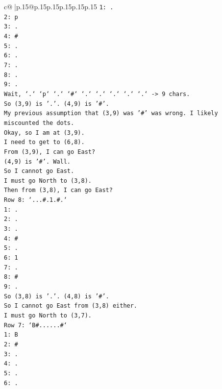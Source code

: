 \documentclass{article}
\begin{document}
{\begin{supertabular}{c@{$\;$}|p{.15\linewidth}@{}p{.15\linewidth}p{.15\linewidth}p{.15\linewidth}p{.15\linewidth}p{.15\linewidth}}
{{{\texttt{1: .} \\
\texttt{2: p} \\
\texttt{3: .} \\
\texttt{4: \#} \\
\texttt{5: .} \\
\texttt{6: .} \\
\texttt{7: .} \\
\texttt{8: .} \\
\texttt{9: .} \\
\texttt{Wait, `.` `p` `.` `\#` `.` `.` `.` `.` `.` {-}> 9 chars.} \\
\texttt{So (3,9) is '.'. (4,9) is '\#'.} \\
\texttt{My previous assumption that (3,9) was '\#' was wrong. I likely miscounted the dots.} \\
\texttt{Okay, so I am at (3,9).} \\
\texttt{I need to get to (6,8).} \\
\texttt{From (3,9), I can go East?} \\
\texttt{(4,9) is '\#'. Wall.} \\
\texttt{So I cannot go East.} \\
\texttt{I must go North to (3,8).} \\
\texttt{Then from (3,8), I can go East?} \\
\texttt{Row 8: `...\#.1.\#.`} \\
\texttt{1: .} \\
\texttt{2: .} \\
\texttt{3: .} \\
\texttt{4: \#} \\
\texttt{5: .} \\
\texttt{6: 1} \\
\texttt{7: .} \\
\texttt{8: \#} \\
\texttt{9: .} \\
\texttt{So (3,8) is '.'. (4,8) is '\#'.} \\
\texttt{So I cannot go East from (3,8) either.} \\
\texttt{I must go North to (3,7).} \\
\texttt{Row 7: `B\#......\#`} \\
\texttt{1: B} \\
\texttt{2: \#} \\
\texttt{3: .} \\
\texttt{4: .} \\
\texttt{5: .} \\
\texttt{6: .} \\
}}}
\end{supertabular}}
\end{document}
